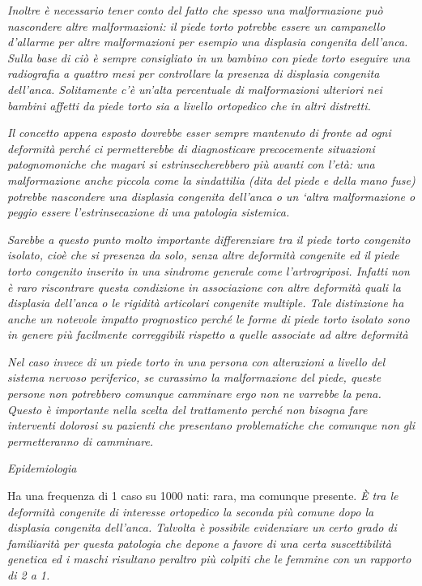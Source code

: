\documentclass[]{article}
\begin{document}
\emph{Inoltre è necessario tener conto del fatto che spesso una
malformazione può nascondere altre malformazioni: il piede torto
potrebbe essere un campanello d'allarme per altre malformazioni per
esempio una displasia congenita dell'anca. Sulla base di ciò è sempre
consigliato in un bambino con piede torto eseguire una radiografia a
quattro mesi per controllare la presenza di displasia congenita
dell'anca. Solitamente c'è un'alta percentuale di malformazioni
ulteriori nei bambini affetti da piede torto sia a livello ortopedico
che in altri distretti.}

\emph{Il concetto appena esposto dovrebbe esser sempre mantenuto di
fronte ad ogni deformità perché ci permetterebbe di diagnosticare
precocemente situazioni patognomoniche che magari si estrinsecherebbero
più avanti con l'età: una malformazione anche piccola come la
sindattilia (dita del piede e della mano fuse) potrebbe nascondere una
displasia congenita dell'anca o un `altra malformazione o peggio essere
l'estrinsecazione di una patologia sistemica.}

\emph{Sarebbe a questo punto molto importante differenziare tra il piede
torto congenito \emph{isolato}, cioè che si presenza da solo, senza
altre deformità congenite ed il piede torto congenito inserito in una
\emph{sindrome generale} come l'artrogriposi. Infatti non è raro
riscontrare questa condizione in associazione con altre deformità quali
la displasia dell'anca o le rigidità articolari congenite multiple. Tale
distinzione ha anche un notevole impatto prognostico perché le forme di
piede torto isolato sono in genere più facilmente correggibili rispetto
a quelle associate ad altre deformità}

\emph{Nel caso invece di un piede torto in una persona con alterazioni a
livello del sistema nervoso periferico, se curassimo la malformazione
del piede, queste persone non potrebbero comunque camminare ergo non ne
varrebbe la pena. Questo è importante nella scelta del trattamento
perché non bisogna fare interventi dolorosi su pazienti che presentano
problematiche che comunque non gli permetteranno di camminare.}

\emph{Epidemiologia }

Ha una frequenza di 1 caso su 1000 nati: rara, ma comunque presente.
\emph{È tra le deformità congenite di interesse ortopedico la seconda
più comune dopo la displasia congenita dell'anca. Talvolta è possibile
evidenziare un certo grado di \emph{familiarità} per questa patologia
che depone a favore di una certa suscettibilità genetica ed i maschi
risultano peraltro più colpiti che le femmine con un rapporto di 2 a 1.
}
\end{document}
